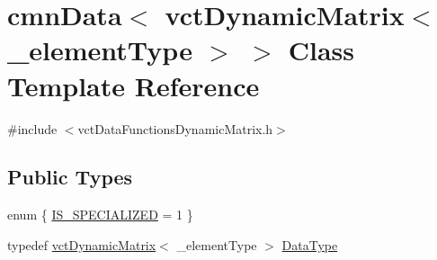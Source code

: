 \hypertarget{classcmn_data_3_01vct_dynamic_matrix_3_01__element_type_01_4_01_4}{}\section{cmn\+Data$<$ vct\+Dynamic\+Matrix$<$ \+\_\+element\+Type $>$ $>$ Class Template Reference}
\label{classcmn_data_3_01vct_dynamic_matrix_3_01__element_type_01_4_01_4}


{\ttfamily \#include $<$vct\+Data\+Functions\+Dynamic\+Matrix.\+h$>$}

\subsection*{Public Types}
\begin{DoxyCompactItemize}
\item 
enum \{ \hyperlink{classcmn_data_3_01vct_dynamic_matrix_3_01__element_type_01_4_01_4_aef8d134adbdf78f3bda65daf485c2bd6abf692d4df8b5d1c66f90c50c64a9edc8}{I\+S\+\_\+\+S\+P\+E\+C\+I\+A\+L\+I\+Z\+E\+D} = 1
 \}
\item 
typedef \hyperlink{classvct_dynamic_matrix}{vct\+Dynamic\+Matrix}$<$ \+\_\+element\+Type $>$ \hyperlink{classcmn_data_3_01vct_dynamic_matrix_3_01__element_type_01_4_01_4_aac077247ac3ce4c624c4636509abe930}{Data\+Type}
\end{DoxyCompactItemize}
